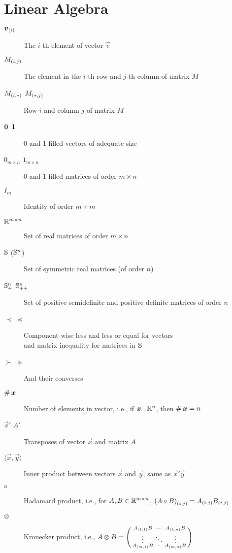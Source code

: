 \section*{Linear Algebra}
\begin{description}

  \item[${\elem[i]{\vec{v}}}$] The $i$-th element of vector $\vec{v}$
  \item[${\elem[i,j]{M}}$] The element in the $i$-th row and $j$-th column of matrix $M$
  \item[${\elem[i,*]{M}}$ ${\elem[*,j]{M}}$] Row $i$ and column $j$ of matrix $M$
  \item[$\0$ $\1$] 0 and 1 filled vectors of adequate size
  \item[$0_{m\times n}$ $1_{m\times n}$] 0 and 1 filled matrices of order $m\times n$
  \item[$I_{m}$] Identity of order $m\times m$
  \item[$\R^{m\times n}$] Set of real matrices of order $m\times n$
  \item[$\symmetric$ ($\symmetric^{n}$)] Set of symmetric real matrices (of order $n$)
  \item[$\semidefpos^{n}$ $\defpos^{n}$] Set of positive semidefinite and positive definite matrices of order $n$
  \item[$\prec$ $\preceq$] Component-wise less and less or equal for vectors \\and matrix inequality for matrices in $\symmetric$
  \item[$\succ$ $\succeq$] And their converses

  \item[$\card{\vec{x}}$] Number of elements in vector, i.e., if $\vec{x}:\R^{n}$, then $\card{\vec{x}}=n$
  \item[$\vec{x}'$ $A'$] Transposes of vector $\vec{x}$ and matrix $A$
  \item[$\langle \vec{x},\vec{y}\rangle$] Inner product between vectors $\vec{x}$ and $\vec{y}$, same as $\vec{x}'\vec{y}$
  \item[$\hadamard{}{}$ ] Hadamard product, i.e., for $A,B\in\R^{m\times n}$, $\elem[i,j]{(\hadamard{A}{B})}=\elem[i,j]{A}\elem[i,j]{B}$
  \item[$\kron{}{}$] Kronecker product, i.e., $\kron{A}{B}=
        \left(\begin{smallmatrix}
            \elem[1,1]{A}B& \cdots &\elem[1,n]{A}B\\
            \vdots&\ddots&\vdots\\
            \elem[m,1]{A}B&\cdots&\elem[m,n]{A}B
        \end{smallmatrix}\right)
        $


\end{description}
